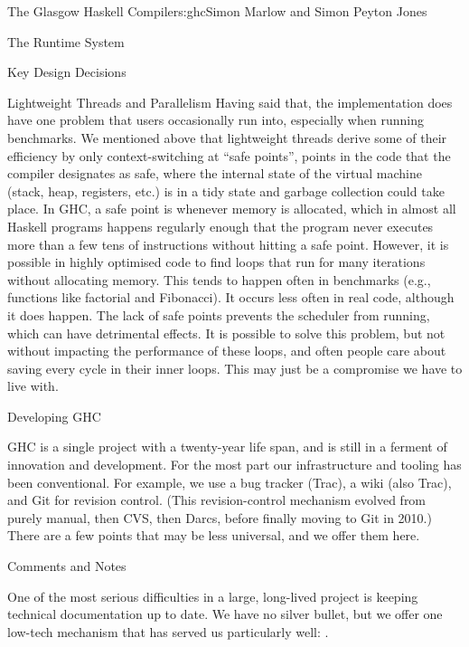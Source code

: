 \begin{aosachapter}{The Glasgow Haskell Compiler}{s:ghc}{Simon Marlow and Simon Peyton Jones}
\begin{aosasect1}{The Runtime System}
\begin{aosasect2}{Key Design Decisions}
\begin{aosasect3}{Lightweight Threads and Parallelism}
Having said that, the implementation does have one problem that users
occasionally run into, especially when running benchmarks.  We
mentioned above that lightweight threads derive some of their
efficiency by only context-switching at ``safe points'', points in the
code that the compiler designates as safe, where the internal state of
the virtual machine (stack, heap, registers, etc.) is in a tidy state
and garbage collection could take place. In GHC, a safe point is
whenever memory is allocated, which in almost all Haskell programs
happens regularly enough that the program never executes more than a
few tens of instructions without hitting a safe point.  However, it is
possible in highly optimised code to find loops that run for many
iterations without allocating memory. This tends to happen often in
benchmarks (e.g., functions like factorial and Fibonacci).  It occurs
less often in real code, although it does happen.  The lack of safe
points prevents the scheduler from running, which can have detrimental
effects.  It is possible to solve this problem, but not without
impacting the performance of these loops, and often people care about
saving every cycle in their inner loops.  This may just be a
compromise we have to live with.

\end{aosasect3}

\end{aosasect2}

\end{aosasect1}

\begin{aosasect1}{Developing GHC}

GHC is a single project with a twenty-year life span, and is still in
a ferment of innovation and development.  For the most part our
infrastructure and tooling has been conventional.  For example, we use
a bug tracker (Trac), a wiki (also Trac), and Git for revision
control. (This revision-control mechanism evolved from purely manual,
then CVS, then Darcs, before finally moving to Git in 2010.)  There
are a few points that may be less universal, and we offer them here.

\begin{aosasect2}{Comments and Notes}

One of the most serious difficulties in a large, long-lived project is
keeping technical documentation up to date.  We have no silver bullet,
but we offer one low-tech mechanism that has served us particularly
well: .


\end{aosasect2}
\end{aosasect1}
\end{aosachapter}
